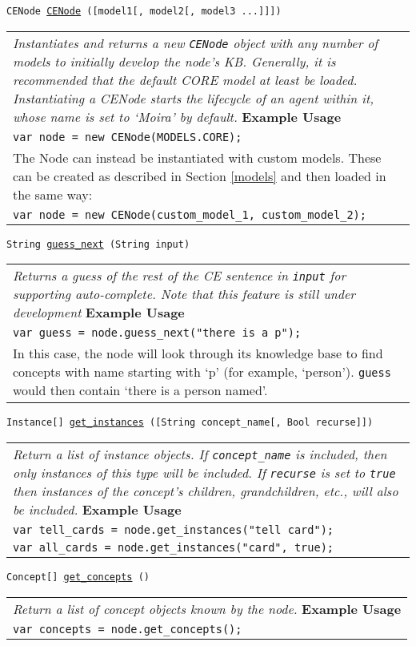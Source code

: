 \documentclass{scrartcl}
\newcommand{\js}[1]{\texttt{#1}}
\begin{document}
\newcommand{\cenodemethod}[5]{
    \begin{flushleft}
    \begin{minipage}{1.2\textwidth}
    \vskip10pt
    \begin{large}
        \noindent\js{#1 \underline{#2} (#3)}
    \end{large}
    \vskip5pt
    \begin{tabular}{|p{0.9\textwidth}}
        \textit{#4}
        \vskip8pt
        \textbf{Example Usage}\\
        #5
    \end{tabular}
    \end{minipage}
    \end{flushleft}
}

\cenodemethod{CENode}{CENode}{[model1[, model2[, model3 ...]]]}{Instantiates and returns a new \js{CENode} object with any number of models to initially develop the node's KB. Generally, it is recommended that the default CORE model at least be loaded. Instantiating a CENode starts the lifecycle of an agent within it, whose name is set to `Moira' by default.}{
    \js{var node = new CENode(MODELS.CORE);}\\
    The Node can instead be instantiated with custom models. These can be created as described in Section \ref{models} and then loaded in the same way:\\
    \js{var node = new CENode(custom\_model\_1, custom\_model\_2);}
}

\cenodemethod{String}{guess\_next}{String input}{Returns a guess of the rest of the CE sentence in \js{input} for supporting auto-complete. Note that this feature is still under development}{
    \js{var guess = node.guess\_next("there is a p");}\\
    In this case, the node will look through its knowledge base to find concepts with name starting with `p' (for example, `person'). \js{guess} would then contain `there is a person named'.
}

\cenodemethod{Instance[]}{get\_instances}{[String concept\_name[, Bool recurse]]}{Return a list of instance objects. If \js{concept\_name} is included, then only instances of this type will be included. If \js{recurse} is set to \js{true} then instances of the concept's children, grandchildren, etc., will also be included.}{
    \js{var tell\_cards = node.get\_instances("tell card");}\\
    \js{var all\_cards = node.get\_instances("card", true);}
}

\cenodemethod{Concept[]}{get\_concepts}{}{Return a list of concept objects known by the node.}{
    \js{var concepts = node.get\_concepts();}\\
}
\end{document}
